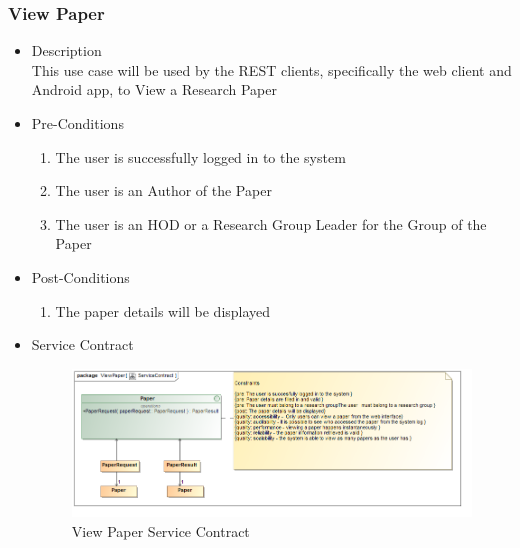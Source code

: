 \documentclass[a4paper,10pt]{article}
\begin{document}
\subsubsection{View Paper}
	\begin{itemize}
		\item Description\\
			This use case will be used by the REST clients, specifically the web client and Android app, to View a Research Paper
		\item Pre-Conditions
			\begin{enumerate}
				\item The user is successfully logged in to the system
				\item The user is an Author of the Paper
				\item The user is an HOD or a Research Group Leader for the Group of the Paper
			\end{enumerate}
		\item Post-Conditions
			\begin{enumerate}
				\item The paper details will be displayed
						
			\end{enumerate}
		\item Service Contract
			\begin{figure}[H]
				\includegraphics[scale=0.5]{ViewPaperServiceContract}
				\caption{View Paper Service Contract}
			\end{figure}

	\end{itemize}
\end{document}
